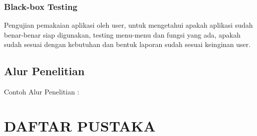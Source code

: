 \documentclass[oneside,listof=totoc]{scrbook}
\begin{document}
\subsection{Black-box Testing}
Pengujian pemakaian aplikasi oleh user, untuk mengetahui apakah aplikasi sudah benar-benar siap digunakan, testing menu-menu dan fungsi yang ada, apakah sudah sesuai dengan kebutuhan dan bentuk laporan sudah sesuai keinginan user.

\section{Alur Penelitian}
Contoh Alur Penelitian :


\backmatter
\pagestyle{plain}

\chapter{DAFTAR PUSTAKA}

\vspace{0.5cm}
\end{document}
